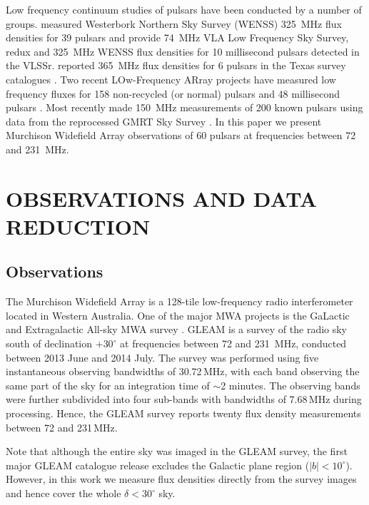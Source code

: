 \documentclass{pasa}%
\begin{document}

Low frequency continuum studies of pulsars have been conducted by a number of groups. \citet{kouwenhoven00} measured Westerbork Northern Sky Survey (WENSS) 325~MHz flux densities for 39 pulsars and \citet{kuniyoshi15} provide 74~MHz VLA Low Frequency Sky Survey, redux \citep[VLSSr;][]{lane14} and 325~MHz WENSS flux densities for 10 millisecond pulsars detected in the VLSSr.
\citet{kaplan00} reported 365~MHz flux densities for 6 pulsars in the Texas survey catalogues \citep{douglas96}.
Two recent LOw-Frequency ARray \citep[LOFAR;][]{vanhaarlem13} projects have measured low frequency fluxes for 158 non-recycled (or normal) pulsars \citep{bilous16} and 48 millisecond pulsars \citep{kondratiev16}. Most recently \citet{frail16} made 150~MHz measurements of 200 known pulsars using data from the reprocessed GMRT Sky Survey \citep[TGSS ADR;][]{intema16}. In this paper we present Murchison Widefield Array observations of 60 pulsars at frequencies between 72 and 231~MHz.
 
\section{OBSERVATIONS AND DATA REDUCTION}\label{s_obs}
\subsection{Observations}
The Murchison Widefield Array \citep[MWA;][]{tingay13} is a 128-tile low-frequency radio interferometer located in Western Australia. One of the major MWA projects is the GaLactic and Extragalactic All-sky MWA survey \citep[GLEAM;][]{wayth15}. GLEAM is a survey of the radio sky south of declination $+30^\circ$ at frequencies between 72 and 231~MHz, conducted between 2013 June and 2014 July. The survey was performed using five instantaneous observing bandwidths of 30.72\,MHz, with each band observing the same part of the sky for an integration time of $\sim$2 minutes. The observing bands were further subdivided into four sub-bands with bandwidths of 7.68\,MHz during processing. Hence, the GLEAM survey reports twenty flux density measurements between 72 and 231\,MHz. 

Note that although the entire sky was imaged in the GLEAM survey, the first major GLEAM catalogue release \citep{hurleywalker16} excludes the Galactic plane region ($|b|<10^\circ$). However, in this work we measure flux densities directly from the survey images and hence cover the whole $\delta<30^\circ$ sky.
\end{document}
